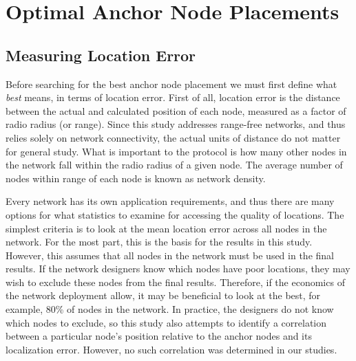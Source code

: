 \chapter{Optimal Anchor Node Placements}
\label{chap:placments}
\section{Measuring Location Error}
Before searching for the best anchor node placement we must first define what \emph{best} means, in terms of location error.  First of all, location error is the distance between the actual and calculated position of each node, measured as a factor of radio radius (or range).  Since this study addresses range-free networks, and thus relies solely on network connectivity, the actual units of distance do not matter for general study.  What is important to the protocol is how many other nodes in the network fall within the radio radius of a given node.  The average number of nodes within range of each node is known as network density.

Every network has its own application requirements, and thus there are many options for what statistics to examine for accessing the quality of locations.  The simplest criteria is to look at the mean location error across all nodes in the network.  For the most part, this is the basis for the results in this study.  However, this assumes that all nodes in the network must be used in the final results.  If the network designers know which nodes have poor locations, they may wish to exclude these nodes from the final results.  Therefore, if the economics of the network deployment allow, it may be beneficial to look at the best, for example, 80\% of nodes in the network.  In practice, the designers do not know which nodes to exclude, so this study also attempts to identify a correlation between a particular node's position relative to the anchor nodes and its localization error.  However, no such correlation was determined in our studies.

